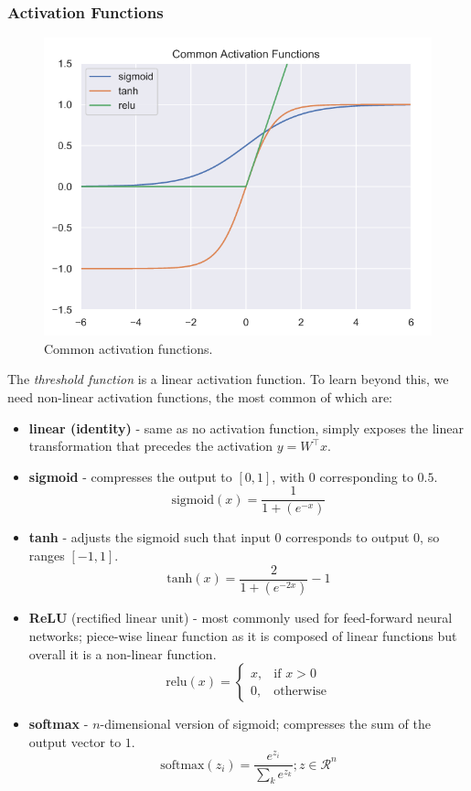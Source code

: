 \documentclass[11pt]{article}
\begin{document}
\subsubsection{Activation Functions}
\begin{figure}[htb!]
  \centering
  \caption{Common activation functions.}
  \includegraphics[scale=0.4]{caf}
\end{figure}
The \textit{threshold function} is a linear activation function.
To learn beyond this, we need non-linear activation functions, the most common of which are:
\begin{itemize}
  \item \textbf{linear (identity)} - same as no activation function, simply exposes the linear transformation that precedes the activation $y = W^\intercal x$.
  \item \textbf{sigmoid} - compresses the output to $[0, 1]$, with $0$ corresponding to $0.5$.
    \[
      \text{sigmoid}(x) = \frac{1}{1 + (e^{-x})} 
    \]
  \item \textbf{tanh} - adjusts the sigmoid such that input $0$ corresponds to output $0$, so ranges $[-1, 1]$.
    \[
      \text{tanh}(x) = \frac{2}{1 + (e^{-2x})} - 1 
    \]
  \item \textbf{ReLU} (rectified linear unit) - most commonly used for feed-forward neural networks; piece-wise linear function as it is composed of linear functions but overall it is a non-linear function.
    \[
      \text{relu}(x) =
      \begin{cases}
        x, & \text{if } x > 0 \\
        0, & \text{otherwise}
      \end{cases}
    \]
  \item \textbf{softmax} - $n$-dimensional version of sigmoid; compresses the sum of the output vector to $1$.
    \[
      \text{softmax}(z_i) = \frac{e^{z_i}}{\sum_k e^{z_k}}; z \in \mathcal{R}^n 
    \]
\end{itemize}
\end{document}
